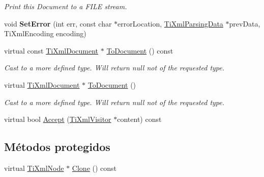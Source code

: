 \begin{DoxyCompactItemize}
\begin{DoxyCompactList}\small\item\em Print this Document to a F\-I\-L\-E stream. \end{DoxyCompactList}\item 
\hypertarget{class_ti_xml_document_a735c23e318597b920c94eae77fa206de}{void {\bfseries Set\-Error} (int err, const char $\ast$error\-Location, \hyperlink{class_ti_xml_parsing_data}{Ti\-Xml\-Parsing\-Data} $\ast$prev\-Data, Ti\-Xml\-Encoding encoding)}\label{class_ti_xml_document_a735c23e318597b920c94eae77fa206de}

\item 
\hypertarget{class_ti_xml_document_a1dc977bde3e4fe85a8eb9d88a35ef5a4}{virtual const \hyperlink{class_ti_xml_document}{Ti\-Xml\-Document} $\ast$ \hyperlink{class_ti_xml_document_a1dc977bde3e4fe85a8eb9d88a35ef5a4}{To\-Document} () const }\label{class_ti_xml_document_a1dc977bde3e4fe85a8eb9d88a35ef5a4}

\begin{DoxyCompactList}\small\item\em Cast to a more defined type. Will return null not of the requested type. \end{DoxyCompactList}\item 
\hypertarget{class_ti_xml_document_a1025d942a1f328fd742d545e37efdd42}{virtual \hyperlink{class_ti_xml_document}{Ti\-Xml\-Document} $\ast$ \hyperlink{class_ti_xml_document_a1025d942a1f328fd742d545e37efdd42}{To\-Document} ()}\label{class_ti_xml_document_a1025d942a1f328fd742d545e37efdd42}

\begin{DoxyCompactList}\small\item\em Cast to a more defined type. Will return null not of the requested type. \end{DoxyCompactList}\item 
virtual bool \hyperlink{class_ti_xml_document_a3daab2f472418ef66315750202f762ae}{Accept} (\hyperlink{class_ti_xml_visitor}{Ti\-Xml\-Visitor} $\ast$content) const 
\end{DoxyCompactItemize}
\subsection*{Métodos protegidos}
\begin{DoxyCompactItemize}
\item 
virtual \hyperlink{class_ti_xml_node}{Ti\-Xml\-Node} $\ast$ \hyperlink{class_ti_xml_document_ac9e8f09b23454d953b32d1b65cd1409e}{Clone} () const 
\end{DoxyCompactItemize}
